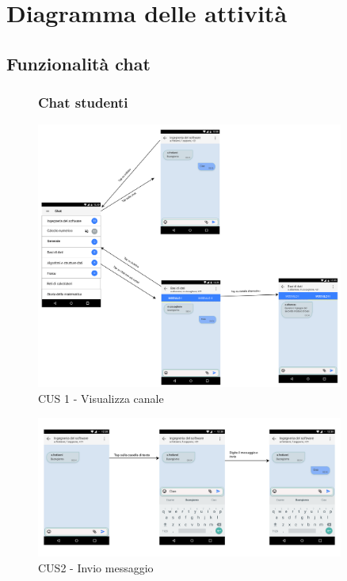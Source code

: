 \section{Diagramma delle attività}

\subsection{Funzionalità chat}

\begin{figure}[!h]
	\subsubsection{Chat studenti}
	\centering
	\includegraphics[width=0.9\textwidth]{imgs/gruppo6/activities/act_cus1_visualizza_canale.pdf}
	\caption{CUS 1 - Visualizza canale}
	\label{fig:act-cus1}
\end{figure}

\begin{figure}
	\centering
	\includegraphics[width=0.9\textwidth]{imgs/gruppo6/activities/act_cus2_invio_messaggio.pdf}
	\caption{CUS2 - Invio messaggio}
	\label{fig:act-cus2}
\end{figure}


